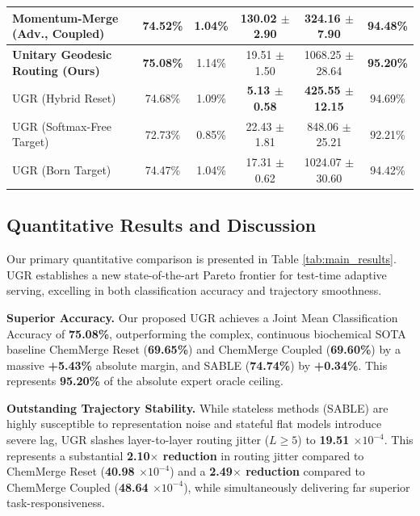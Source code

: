 \begin{table}[t]
\begin{center}
\begin{small}
\begin{sc}
\begin{tabular}{lccccc}
Momentum-Merge (Adv., Coupled) & 74.52\% & 1.04\% & 130.02 $\pm$ 2.90 & 324.16 $\pm$ 7.90 & 94.48\% \\
\midrule
\textbf{Unitary Geodesic Routing (Ours)} & \textbf{75.08\%} & 1.14\% & 19.51 $\pm$ 1.50 & 1068.25 $\pm$ 28.64 & \textbf{95.20\%} \\
UGR (Hybrid Reset) & 74.68\% & 1.09\% & \textbf{5.13 $\pm$ 0.58} & \textbf{425.55 $\pm$ 12.15} & 94.69\% \\
UGR (Softmax-Free Target) & 72.73\% & 0.85\% & 22.43 $\pm$ 1.81 & 848.06 $\pm$ 25.21 & 92.21\% \\
UGR (Born Target) & 74.47\% & 1.04\% & 17.31 $\pm$ 0.62 & 1024.07 $\pm$ 30.60 & 94.42\% \\
\bottomrule
\end{tabular}
\end{sc}
\end{small}
\end{center}
\vskip -0.1in
\end{table}

\subsection{Quantitative Results and Discussion}
\label{subsec:quantitative}
Our primary quantitative comparison is presented in Table \ref{tab:main_results}. UGR establishes a new state-of-the-art Pareto frontier for test-time adaptive serving, excelling in both classification accuracy and trajectory smoothness.

\textbf{Superior Accuracy.} Our proposed UGR achieves a Joint Mean Classification Accuracy of \textbf{75.08\%}, outperforming the complex, continuous biochemical SOTA baseline ChemMerge Reset (\textbf{69.65\%}) and ChemMerge Coupled (\textbf{69.60\%}) by a massive \textbf{+5.43\%} absolute margin, and SABLE (\textbf{74.74\%}) by \textbf{+0.34\%}. This represents \textbf{95.20\%} of the absolute expert oracle ceiling. 

\textbf{Outstanding Trajectory Stability.} While stateless methods (SABLE) are highly susceptible to representation noise and stateful flat models introduce severe lag, UGR slashes layer-to-layer routing jitter ($L \ge 5$) to \textbf{19.51 $\times 10^{-4}$}. This represents a substantial \textbf{2.10$\times$ reduction} in routing jitter compared to ChemMerge Reset (\textbf{40.98 $\times 10^{-4}$}) and a \textbf{2.49$\times$ reduction} compared to ChemMerge Coupled (\textbf{48.64 $\times 10^{-4}$}), while simultaneously delivering far superior task-responsiveness.

